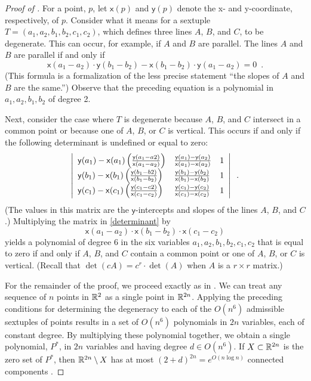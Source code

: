 \documentclass{patmorin}
\newcommand{\x}{\mathsf{x}}
\newcommand{\y}{\mathsf{y}}
\begin{document}
\begin{proof}[Proof of ]
   For a point, $p$, let $\x(p)$ and $\y(p)$ denote the x- and
   y-coordinate, respectively, of $p$.  Consider what it means for a
   sextuple $T=(a_1,a_2,b_1,b_2,c_1,c_2)$, which defines three lines
   $A$, $B$, and $C$, to be degenerate.  This can occur, for example,
   if $A$ and $B$ are parallel.  The lines $A$ and $B$ are parallel if
   and only if
   \[
      \x(a_1-a_2)\cdot \y(b_1-b_2) - 
       \x(b_1-b_2)\cdot \y(a_1-a_2) = 0 \enspace .
   \]
   (This formula is a formalization of the less precise statement
   ``the slopes of $A$ and $B$ are the same.'')
   Observe that the preceding equation is a polynomial in
   $a_1,a_2,b_1,b_2$ of degree 2.

   Next, consider the case where $T$ is degenerate because $A$, $B$, and
   $C$ intersect in a common point or because one of $A$, $B$, or $C$
   is vertical.  This occurs if and only if the following determinant
   is undefined or equal to zero:
   \begin{equation}
   \left|\begin{array}{lll}
   \y(a_1)-\x(a_1)\left(\frac{\y(a_1-a2)}{\x(a_1-a_2)}\right) & \frac{\y(a_1)-\y(a_2)}{\x(a_1)-\x(a_2)} & 1 \\
   \y(b_1)-\x(b_1)\left(\frac{\y(b_1-b2)}{\x(b_1-b_2)}\right) & \frac{\y(b_1)-\y(b_2)}{\x(b_1)-\x(b_2)}  & 1 \\
   \y(c_1)-\x(c_1)\left(\frac{\y(c_1-c2)}{\x(c_1-c_2)}\right) & \frac{\y(c_1)-\y(c_2)}{\x(c_1)-\x(c_2)}  & 1 \\
   \end{array}\right| \enspace .
   \eqlabel{determinant}
   \end{equation}
   (The values in this matrix are the $\y$-intercepts and slopes of the
   lines $A$, $B$, and $C$.)
   Multiplying the matrix in \eqref{determinant} by 
   \[
      \x(a_1-a_2)\cdot
      \x(b_1-b_2)\cdot
      \x(c_1-c_2)
   \]
   yields a polynomial of degree $6$ in the six variables
   $a_1,a_2,b_1,b_2,c_1,c_2$ that is equal to zero if and only if $A$,
   $B$, and $C$ contain a common point or one of $A$, $B$, or $C$
   is vertical. (Recall that $\det(cA)=c^r\cdot\det(A)$ when $A$ is a
   $r\times r$ matrix.)

   For the remainder of the proof, we proceed exactly as in
   \cite{goodman.pollack:upper}.  We can treat any sequence of $n$
   points in $\mathbb{R}^2$ as a single point in $\mathbb{R}^{2n}$.  Applying the
   preceding conditions for determining the degeneracy to each of
   the $O(n^6)$ admissible sextuples of points results in a set of
   $O(n^6)$ polynomials in $2n$ variables, each of constant degree.
   By multiplying these polynomial together, we obtain a single
   polynomial, $P^*$, in $2n$ variables and having degree $d\in O(n^6)$.
   If $X\subset\mathbb{R}^{2n}$ is the zero set of $P^*$, then $\mathbb{R}^{2n}\setminus
   X$ has at most $(2+d)^{2n}=e^{O(n\log n)}$ connected components
   \cite[Lemma~2]{goodman.pollack:upper}.


\end{proof}
\end{document}

